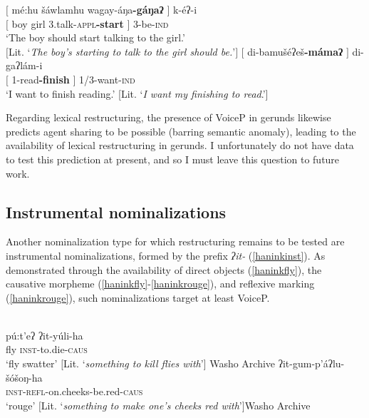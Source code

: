 \documentclass[output=paper]{langscibook}
\begin{document}
 \label{haninkgerundr}
\ea\gll $[$ mé:hu šáwlamhu wagay-áŋa\textbf{-gáŋaʔ} $]$ k-éʔ-i\\ 
$[$ boy girl 3.talk-{\scshape appl}{\bf-start} $]$ 3-be-{\scshape ind}\\
\glt `The boy should start talking to the girl.'\\$[$Lit. `{\itshape The boy's starting to talk to the girl should be.}'$]$ \label{haninkshould}
\vspace{.25em}
\ex \label{haninkfinishread}
\gll $[$ di-bamušéʔeš\textbf{-mámaʔ} $]$  di-gaʔlám-i\\
$[$ 1-read\textbf{-finish} $]$ 1/3-want-{\scshape ind}\\
\glt `I want to finish reading.' [Lit. `{\itshape I want my finishing to read}.']

\z
\z 

Regarding lexical restructuring, the presence of VoiceP in gerunds likewise predicts agent sharing to be possible (barring semantic anomaly), leading to the availability of lexical restructuring in gerunds. I unfortunately do not have data to test this prediction at present, and so I must leave this question to future work.


\subsection{Instrumental nominalizations}

Another nominalization type for which restructuring remains to be tested are instrumental nominalizations, formed by the prefix {\itshape ʔit-} (\ref{haninkinst}). As demonstrated through the availability of direct objects (\ref{haninkfly}), the causative morpheme (\ref{haninkfly}-\ref{haninkrouge}), and reflexive marking (\ref{haninkrouge}), such nominalizations target at least VoiceP.
 
 \label{haninkinst}\\
\ea \gll pú:t'eʔ ʔit-yúli-ha\\
fly {\scshape inst}-to.die-{\scshape caus}\\
\glt `fly swatter' $[$Lit. `{\itshape something to kill flies with}'$]$ \hfill Washo Archive \label{haninkfly}
\ex \gll ʔit-gum-p'áʔlu-šóšoŋ-ha\\
{\scshape inst-refl}-on.cheeks-be.red-{\scshape caus}\\
\glt `rouge'   $[$Lit. `{\itshape something to make one's cheeks red with}'$]$\hfill Washo Archive \label{haninkrouge}
\z
\z
 
\end{document}
